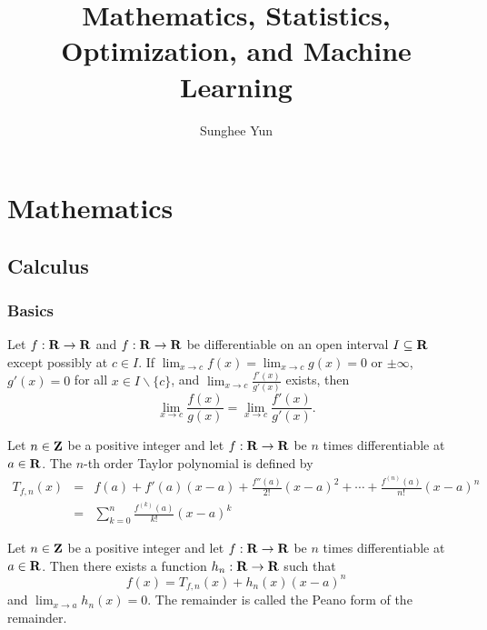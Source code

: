 \documentclass[10pt, twoside]{book}   	%
\title{Mathematics, Statistics, Optimization, and Machine Learning}
\author{Sunghee Yun}
\begin{document}
\maketitle

\setcounter{secnumdepth}{4}
\setcounter{tocdepth}{3}
\tableofcontents


\part{Mathematics}

\chapter{Calculus}

\section{Basics}

\begin{theorem}
Let $f:\mathbf{R}\to\mathbf{R}$ and $f:\mathbf{R}\to\mathbf{R}$ be differentiable on an open interval $I\subseteq \mathbf{R}$
except possibly at $c\in I$.
If $\lim_{x\to c} f(x) = \lim_{x\to c} g(x) = 0$ or $\pm \infty$,
$g'(x)=0$ for all $x\in I\backslash \{c\}$,
and $\lim_{x\to c} \frac{f'(x)}{g'(x)}$ exists,
then
\begin{equation}
\label{eq:lhopital-rule}
\lim_{x\to c} \frac{f(x)}{g(x)}
= \lim_{x\to c} \frac{f'(x)}{g'(x)}.
\end{equation}
\end{theorem}

\begin{definition}
Let $n\in{\mbox{\bf Z}}$ be a positive integer and
let $f:\mathbf{R}\to\mathbf{R}$ be $n$ times differentiable at $a\in\mathbf{R}$.
The $n$-th order Taylor polynomial is defined by
\begin{eqnarray}
T_{f,n}(x) &=& f(a) + f'(a)(x-a)
+ \frac{f''(a)}{2!}(x-a)^2
+ \cdots
+ \frac{f^{(n)}(a)}{n!}(x-a)^n
\nonumber
\\
&=&
\sum_{k=0}^n \frac{f^{(k)}(a)}{k!} (x-a)^k
\label{eq:taylor-poly}
\end{eqnarray}
\end{definition}


\begin{theorem}
\label{theorem:taylor-peano}
Let $n\in{\mbox{\bf Z}}$ be a positive integer and
let $f:\mathbf{R}\to\mathbf{R}$ be $n$ times differentiable at $a\in\mathbf{R}$.
Then there exists a function $h_n:\mathbf{R}\to\mathbf{R}$ such that
\begin{equation}
\label{eq:taylor-peano}
f(x) = T_{f,n}(x) + h_n(x) (x-a)^n
\end{equation}
and $\lim_{x\to a} h_n(x)=0$.
The remainder is called the Peano form of the remainder.
\end{theorem}
\end{document}
